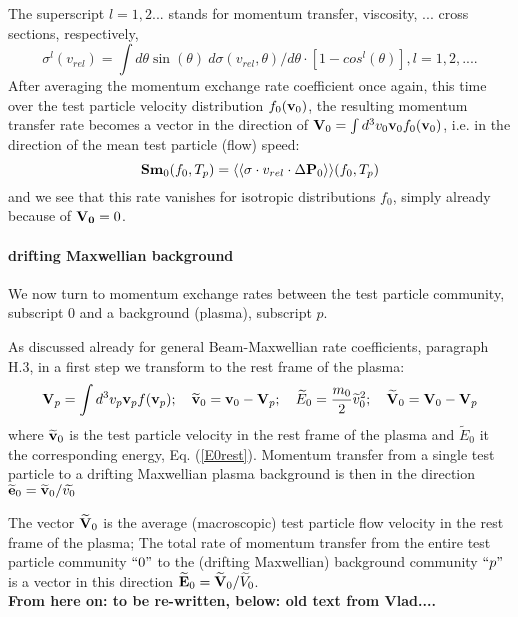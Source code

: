 \documentclass[12pt,dvipdfmx]{article}
\begin{document}
The superscript $l=1,2...$ stands for momentum transfer, viscosity,
... cross sections, respectively,
\begin{equation}
\sigma^l(v_{rel}) = \int d\theta \sin(\theta) \ d\sigma(v_{rel},\theta)/d\theta \cdot [1-cos^l(\theta)], l=1,2,....
\end{equation}
After averaging the momentum exchange rate coefficient once again, this time over the test particle velocity distribution $f_0({\bf v}_0)$, the resulting momentum transfer rate
becomes a vector in the direction of ${\bf V}_0 = \int d^3v_0 {\bf v}_0f_0({\bf v}_0)$, i.e. in the direction of the mean test particle (flow) speed:
\begin{equation}
{\bf Sm}_0(f_0,T_p) =\langle\langle \sigma\cdot v_{rel}\cdot \Delta {\bf P}_0\rangle\rangle(f_0,T_p)
\end{equation}
and we see that this rate vanishes for isotropic distributions $f_0$, simply already because of ${\bf V_0} = 0$.
\\
\paragraph{drifting Maxwellian background}
We now turn to momentum exchange rates between the test particle community, subscript $0$ and a background (plasma), subscript $p$.

As discussed already for general Beam-Maxwellian rate coefficients, paragraph H.3, in a first step we transform to the rest frame of the plasma:
\begin{equation}
{\bf V}_p=\int d^3v_p {\bf v}_p f({\bf v}_p) ;  \quad   \widetilde{{\bf v}}_0= {\bf v}_0 - {\bf V}_p
; \quad \widetilde{E}_0=\frac{m_0}{2} \widetilde{v}_0^2
;  \quad   \widetilde{{\bf V}}_0= {\bf V}_0 - {\bf V}_p
\end{equation}
where $\widetilde{{\bf v}}_0$ is the test particle velocity in the rest frame 
of the plasma and  $\widetilde{E}_0$ it the corresponding energy, Eq. (\ref{E0rest}).
Momentum transfer from a single test particle to a drifting Maxwellian plasma background is then in the direction $\widetilde{{\bf e}}_0=\widetilde{{\bf v}}_0/\widetilde{v_0}$

The vector $\widetilde{{\bf V}}_0$ is the average (macroscopic) test particle flow velocity in the rest frame of the plasma;
The total rate of momentum transfer from the entire test particle community $``0"$ to the (drifting Maxwellian) background community $``p"$
is a vector in this direction  $\widetilde{{\bf E}}_0 = \widetilde{{\bf V}}_0/\widetilde{V}_0$.\\
\textcolor[rgb]{1.00,0.00,0.00}{\textbf{From here on: to be re-written, below: old text from Vlad....}}
\end{document}
